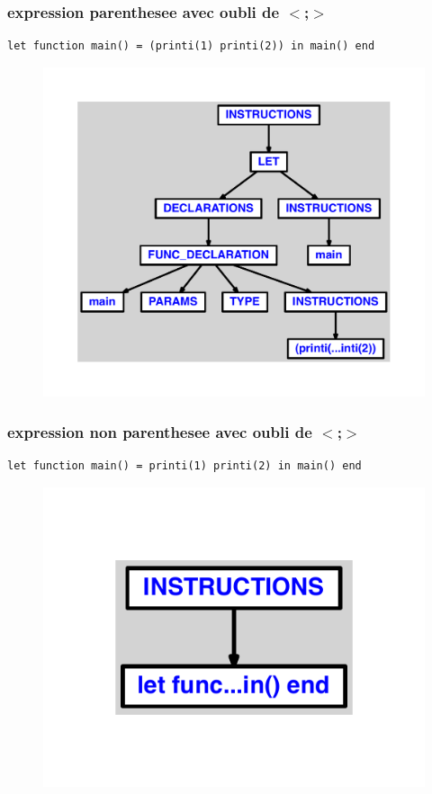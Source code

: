 \documentclass{article}
\begin{document}
\subsubsection{expression parenthesee avec oubli de $ < $;$ > $}
\begin{lstlisting}
let function main() = (printi(1) printi(2)) in main() end
\end{lstlisting}
\newpage
\begin{figure}[H]
\centering
\includegraphics[max width=\textwidth]{ast/ast_35.pdf}
\end{figure}
\newpage
\subsubsection{expression non parenthesee avec oubli de $ < $;$ > $}
\begin{lstlisting}
let function main() = printi(1) printi(2) in main() end
\end{lstlisting}
\newpage
\begin{figure}[H]
\centering
\includegraphics[max width=\textwidth]{ast/ast_36.pdf}
\end{figure}
\newpage
\end{document}
